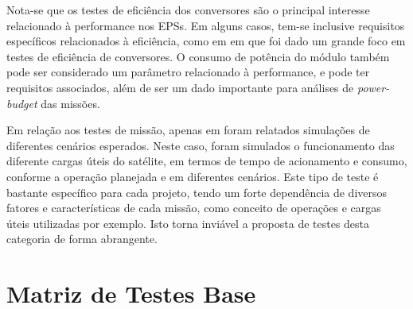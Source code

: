 


Nota-se que os testes de eficiência dos conversores são o principal interesse relacionado à performance nos \gls{EPS}s.
Em alguns casos, tem-se inclusive requisitos específicos relacionados à eficiência, como em \textcite{aalto-eps} em que foi dado um grande foco em testes de eficiência de conversores.
O consumo de potência do módulo também pode ser considerado um parâmetro relacionado à performance, e pode ter requisitos associados, além de ser um dado importante para análises de \textit{power-budget} das missões.

Em relação aos testes de missão, apenas em \textcite{mist-eps} foram relatados simulações de diferentes cenários esperados.
Neste caso, foram simulados o funcionamento das diferente cargas úteis do satélite, em termos de tempo de acionamento e consumo, conforme a operação planejada e em diferentes cenários.
Este tipo de teste é bastante específico para cada projeto, tendo um forte dependência de diversos fatores e características de cada missão, como conceito de operações e cargas úteis utilizadas por exemplo. Isto torna inviável a proposta de testes desta categoria de forma abrangente.


\section{Matriz de Testes Base} \label{sec:matriz-base}


